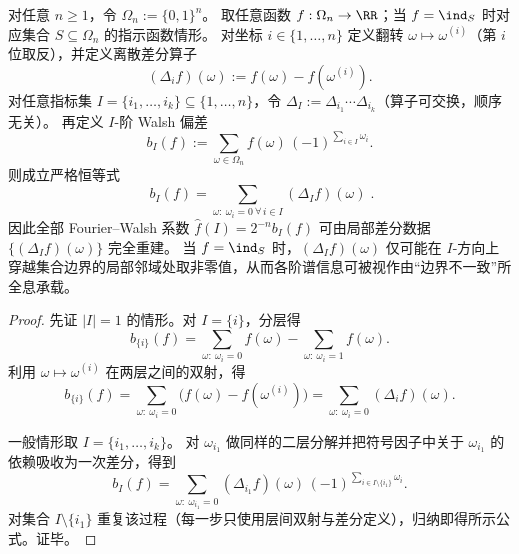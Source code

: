 \begin{theorem}\label{thm:spg-walsh-discrete-stokes-holography}
对任意 \(n\ge 1\)，令 \(\Omega_n:=\{0,1\}^n\)。
取任意函数 \(f:\Omega_n\to\RR\)；当 \(f=\ind_S\) 时对应集合 \(S\subseteq\Omega_n\) 的指示函数情形。
对坐标 \(i\in\{1,\dots,n\}\) 定义翻转 \(\omega\mapsto \omega^{(i)}\)（第 \(i\) 位取反），并定义离散差分算子
\[
(\Delta_i f)(\omega):=f(\omega)-f(\omega^{(i)}).
\]
对任意指标集 \(I=\{i_1,\dots,i_k\}\subseteq\{1,\dots,n\}\)，令 \(\Delta_I:=\Delta_{i_1}\cdots\Delta_{i_k}\)（算子可交换，顺序无关）。
再定义 \(I\)-阶 Walsh 偏差
\[
b_I(f):=\sum_{\omega\in\Omega_n} f(\omega)\,(-1)^{\sum_{i\in I}\omega_i}.
\]
则成立严格恒等式
\[
\boxed{\;
b_I(f)=\sum_{\omega:\ \omega_i=0\ \forall\, i\in I} (\Delta_I f)(\omega)\; }.
\]
因此全部 Fourier--Walsh 系数 \(\widehat f(I)=2^{-n}b_I(f)\) 可由局部差分数据 \(\{(\Delta_I f)(\omega)\}\) 完全重建。
当 \(f=\ind_S\) 时，\((\Delta_I f)(\omega)\) 仅可能在 \(I\)-方向上穿越集合边界的局部邻域处取非零值，从而各阶谱信息可被视作由“边界不一致”所全息承载。
\end{theorem}
\begin{proof}
先证 \(|I|=1\) 的情形。对 \(I=\{i\}\)，分层得
\[
b_{\{i\}}(f)=\sum_{\omega:\ \omega_i=0} f(\omega)-\sum_{\omega:\ \omega_i=1} f(\omega).
\]
利用 \(\omega\mapsto \omega^{(i)}\) 在两层之间的双射，得
\[
b_{\{i\}}(f)=\sum_{\omega:\ \omega_i=0}\bigl(f(\omega)-f(\omega^{(i)})\bigr)
=\sum_{\omega:\ \omega_i=0}(\Delta_i f)(\omega).
\]
\par
一般情形取 \(I=\{i_1,\dots,i_k\}\)。
对 \(\omega_{i_1}\) 做同样的二层分解并把符号因子中关于 \(\omega_{i_1}\) 的依赖吸收为一次差分，得到
\[
b_I(f)=\sum_{\omega:\ \omega_{i_1}=0}(\Delta_{i_1}f)(\omega)\,(-1)^{\sum_{i\in I\setminus\{i_1\}}\omega_i}.
\]
对集合 \(I\setminus\{i_1\}\) 重复该过程（每一步只使用层间双射与差分定义），归纳即得所示公式。证毕。
\end{proof}

